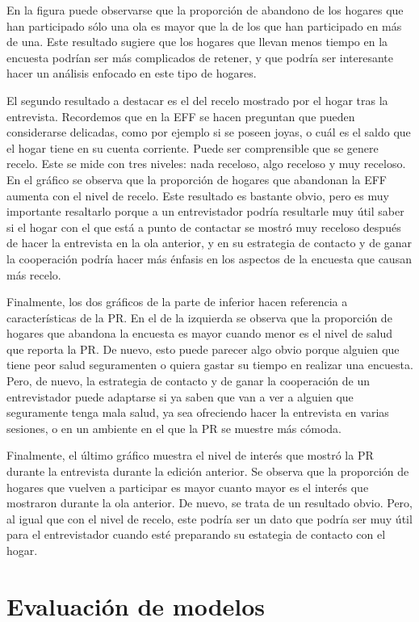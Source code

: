 En la figura puede observarse que la proporción de abandono de los hogares que han participado sólo una ola es mayor que la de los que han participado en más de una. Este resultado sugiere que los hogares que llevan menos tiempo en la encuesta podrían ser más complicados de retener, y que podría ser interesante hacer un análisis enfocado en este tipo de hogares.

El segundo resultado a destacar es el del recelo mostrado por el hogar tras la entrevista. Recordemos que en la EFF se hacen preguntan que pueden considerarse delicadas, como por ejemplo si se poseen joyas, o cuál es el saldo que el hogar tiene en su cuenta corriente. Puede ser comprensible que se genere recelo. Este se mide con tres niveles: nada receloso, algo receloso y muy receloso. En el gráfico se observa que la proporción de hogares que abandonan la EFF aumenta con el nivel de recelo. Este resultado es bastante obvio, pero es muy importante resaltarlo porque a un entrevistador podría resultarle muy útil saber si el hogar con el que está a punto de contactar se mostró muy receloso después de hacer la entrevista en la ola anterior, y en su estrategia de contacto y de ganar la cooperación podría hacer más énfasis en los aspectos de la encuesta que causan más recelo.

Finalmente, los dos gráficos de la parte de inferior hacen referencia a características de la PR. En el de la izquierda se observa que la proporción de hogares que abandona la encuesta es mayor cuando menor es el nivel de salud que reporta la PR. De nuevo, esto puede parecer algo obvio porque alguien que tiene peor salud seguramenten o quiera gastar su tiempo en realizar una encuesta. Pero, de nuevo, la estrategia de contacto y de ganar la cooperación de un entrevistador puede adaptarse si ya saben que van a ver a alguien que seguramente tenga mala salud, ya sea ofreciendo hacer la entrevista en varias sesiones, o en un ambiente en el que la PR se muestre más cómoda.

Finalmente, el último gráfico muestra el nivel de interés que mostró la PR durante la entrevista durante la edición anterior. Se observa que la proporción de hogares que vuelven a participar es mayor cuanto mayor es el interés que mostraron durante la ola anterior. De nuevo, se trata de un resultado obvio. Pero, al igual que con el nivel de recelo, este podría ser un dato que podría ser muy útil para el entrevistador cuando esté preparando su estategia de contacto con el hogar.

\section{Evaluación de modelos}

